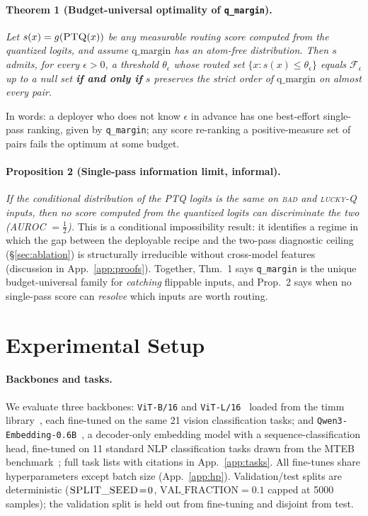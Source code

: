 \documentclass{article}
\newcommand{\ptq}{\textsc{PTQ}\xspace}
\newcommand{\bad}{\textsc{bad}\xspace}
\newcommand{\luckyq}{\textsc{lucky-Q}\xspace}
\begin{document}
\paragraph{Theorem 1 (Budget-universal optimality of \texttt{q\_margin}).}
\emph{Let $s(x) = g(\ptq(x))$ be any measurable routing score computed from the quantized logits, and assume $\mathrm{q\_margin}$ has an atom-free distribution. Then $s$ admits, for every $\epsilon > 0$, a threshold $\theta_\epsilon$ whose routed set $\{x : s(x) \leq \theta_\epsilon\}$ equals $\mathcal F_\epsilon$ up to a null set \textbf{if and only if} $s$ preserves the strict order of $\mathrm{q\_margin}$ on almost every pair.}

In words: a deployer who does not know $\epsilon$ in advance has one best-effort single-pass ranking, given by \texttt{q\_margin}; any score re-ranking a positive-measure set of pairs fails the optimum at some budget.

\paragraph{Proposition 2 (Single-pass information limit, informal).}
\emph{If the conditional distribution of the \ptq{} logits is the same on \bad{} and \luckyq{} inputs, then no score computed from the quantized logits can discriminate the two (AUROC $= \tfrac12$).}
This is a conditional impossibility result: it identifies a regime in which the gap between the deployable recipe and the two-pass diagnostic ceiling (\S\ref{sec:ablation}) is structurally irreducible without cross-model features (discussion in App.~\ref{app:proofs}). Together, Thm.~1 says \texttt{q\_margin} is the unique budget-universal family for \emph{catching} flippable inputs, and Prop.~2 says when no single-pass score can \emph{resolve} which inputs are worth routing.

\section{Experimental Setup}\label{sec:setup}

\paragraph{Backbones and tasks.}
We evaluate three backbones: \texttt{ViT-B/16} and \texttt{ViT-L/16}~\cite{dosovitskiy2021image} loaded from the timm library~\cite{rw2019timm}, each fine-tuned on the same 21 vision classification tasks; and \texttt{Qwen3-Embedding-0.6B}~\cite{zhang2025qwen3}, a decoder-only embedding model with a sequence-classification head, fine-tuned on 11 standard NLP classification tasks drawn from the MTEB benchmark~\cite{muennighoff2023mteb}; full task lists with citations in App.~\ref{app:tasks}.
All fine-tunes share hyperparameters except batch size (App.~\ref{app:hp}). Validation/test splits are deterministic (\(\textsc{SPLIT\_SEED}\!=\!0\), \(\text{VAL\_FRACTION}\!=\!0.1\) capped at 5000 samples); the validation split is held out from fine-tuning and disjoint from test.
\end{document}
